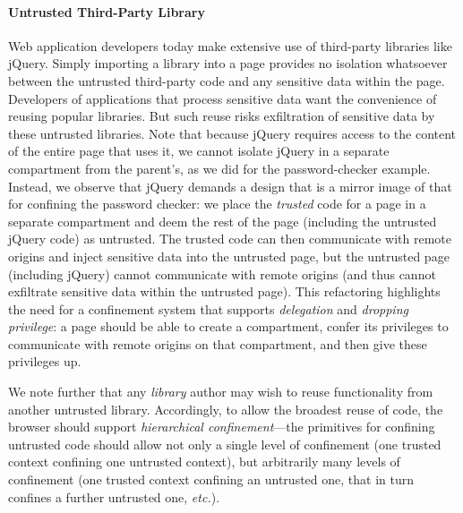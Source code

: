 \paragraph{Untrusted Third-Party Library}
Web application developers today make extensive use of third-party
libraries like jQuery. Simply importing a library into a page provides
no isolation whatsoever between the untrusted third-party code and any
sensitive data within the page. Developers of applications that
process sensitive data want the convenience of reusing popular
libraries. But such reuse risks exfiltration of sensitive data by
these untrusted libraries. Note that because jQuery requires access to
the content of the entire page that uses it, we cannot isolate jQuery
in a separate compartment from the parent's, as we did for the
password-checker example. Instead, we observe that jQuery demands a
design that is a mirror image of that for confining the password
checker: we place the {\em trusted} code for a page in a separate
compartment and deem the rest of the page (including the untrusted
jQuery code) as untrusted. The trusted code can then communicate with
remote origins and inject sensitive data into the untrusted page, but
the untrusted page (including jQuery) cannot communicate with remote
origins (and thus cannot exfiltrate sensitive data within the
untrusted page).
This refactoring highlights the need for a confinement system that
supports {\em delegation} and {\em dropping privilege}: a page should
be able to create a compartment, confer its privileges to
communicate with remote origins on that compartment, and then give
these privileges up.

We note further that any {\em library} author
may wish to reuse functionality from another untrusted
library. Accordingly, to allow the broadest reuse of code, the browser
should support {\em hierarchical confinement}---the primitives for
confining untrusted code should allow not only a single level of
confinement (one trusted context confining one untrusted context), but
arbitrarily many levels of confinement (one trusted context confining
an untrusted one, that in turn confines a further untrusted one,
\emph{etc.}).



